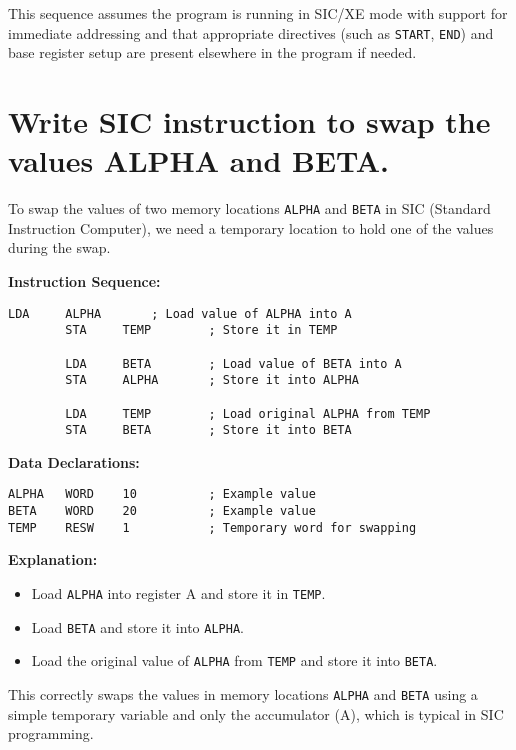 \documentclass[12pt]{article}
\begin{document}
This sequence assumes the program is running in SIC/XE mode with support for immediate addressing and that appropriate directives (such as \texttt{START}, \texttt{END}) and base register setup are present elsewhere in the program if needed.



\newpage
\section{Write SIC instruction to swap the values ALPHA and BETA.}

To swap the values of two memory locations \texttt{ALPHA} and \texttt{BETA} in SIC (Standard Instruction Computer), we need a temporary location to hold one of the values during the swap.

\textbf{Instruction Sequence:}

\begin{lstlisting}[language={[x86masm]Assembler}]
        LDA     ALPHA       ; Load value of ALPHA into A
        STA     TEMP        ; Store it in TEMP

        LDA     BETA        ; Load value of BETA into A
        STA     ALPHA       ; Store it into ALPHA

        LDA     TEMP        ; Load original ALPHA from TEMP
        STA     BETA        ; Store it into BETA
\end{lstlisting}

\textbf{Data Declarations:}

\begin{lstlisting}[language={[x86masm]Assembler}]
ALPHA   WORD    10          ; Example value
BETA    WORD    20          ; Example value
TEMP    RESW    1           ; Temporary word for swapping
\end{lstlisting}

\textbf{Explanation:}
\begin{itemize}
    \item Load \texttt{ALPHA} into register A and store it in \texttt{TEMP}.
    \item Load \texttt{BETA} and store it into \texttt{ALPHA}.
    \item Load the original value of \texttt{ALPHA} from \texttt{TEMP} and store it into \texttt{BETA}.
\end{itemize}

This correctly swaps the values in memory locations \texttt{ALPHA} and \texttt{BETA} using a simple temporary variable and only the accumulator (A), which is typical in SIC programming.
\end{document}
